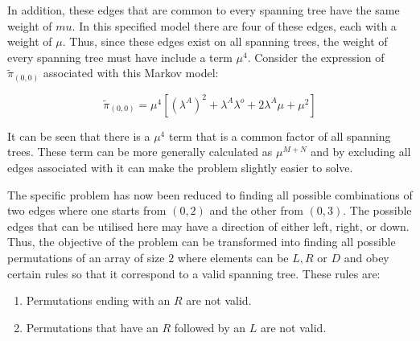 In addition, these edges that are common to every spanning tree have the same weight of \(mu\). In this specified model there are four of these edges, each with a weight of \(\mu\). Thus, since these edges exist on all spanning trees, the weight of every spanning tree must have include a term \(\mu^4\). Consider the expression of \(\tilde{\pi}_{(0,0)}\) associated with this Markov model:

\begin{equation}
    \tilde{\pi}_{(0,0)} = \mu^4[(\lambda^A)^2 + \lambda^A \lambda^o + 2\lambda^A \mu + \mu^2] 
\end{equation}

It can be seen that there is a \(\mu^4\) term that is a common factor of all spanning trees. These term can be more generally calculated as \(\mu^{M+N}\) and by excluding all edges associated with it can make the problem slightly easier to solve. 

\begin{figure}[h]
    \centering
\end{figure}

The specific problem has now been reduced to finding all possible combinations of two edges where one starts from \((0,2)\) and the other from \((0,3)\). The possible edges that can be utilised here may have a direction of either left, right, or down. Thus, the objective of the problem can be transformed into finding all possible permutations of an array of size \(2\) where elements can be \(L, R \text{ or } D\) and obey certain rules so that it correspond to a valid spanning tree. These rules are:

\begin{enumerate}
    \item Permutations ending with an \(R\) are not valid. \label{rule1}
    \item Permutations that have an \(R\) followed by an \(L\) are not valid. \label{rule2}
\end{enumerate}

